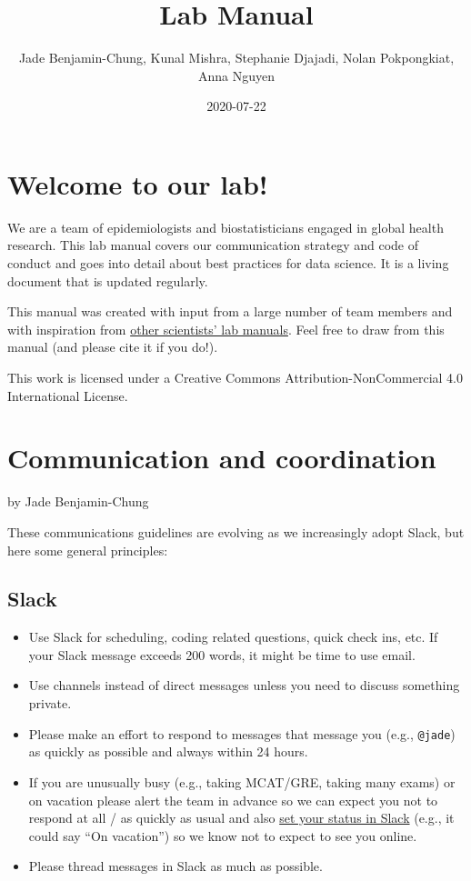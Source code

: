 \documentclass[]{book}
\title{Lab Manual}
\author{Jade Benjamin-Chung, Kunal Mishra, Stephanie Djajadi, Nolan Pokpongkiat,
Anna Nguyen}
\date{2020-07-22}
\providecommand{\tightlist}{%
  \setlength{\itemsep}{0pt}\setlength{\parskip}{0pt}}
\begin{document}
\maketitle

{
\setcounter{tocdepth}{1}
\tableofcontents
}
\chapter{Welcome to our lab!}\label{welcome-to-our-lab}

We are a team of epidemiologists and biostatisticians engaged in global
health research. This lab manual covers our communication strategy and
code of conduct and goes into detail about best practices for data
science. It is a living document that is updated regularly.

This manual was created with input from a large number of team members
and with inspiration from
\href{https://github.com/alylab/labmanual/blob/master/aly-lab-manual.pdf}{other
scientists' lab manuals}. Feel free to draw from this manual (and please
cite it if you do!).

 This work is licensed under a Creative Commons
Attribution-NonCommercial 4.0 International License.

\chapter{Communication and
coordination}\label{communication-and-coordination}

by Jade Benjamin-Chung

These communications guidelines are evolving as we increasingly adopt
Slack, but here some general principles:

\section{Slack}\label{slack}

\begin{itemize}
\tightlist
\item
  Use Slack for scheduling, coding related questions, quick check ins,
  etc. If your Slack message exceeds 200 words, it might be time to use
  email.
\item
  Use channels instead of direct messages unless you need to discuss
  something private.
\item
  Please make an effort to respond to messages that message you (e.g.,
  \texttt{@jade}) as quickly as possible and always within 24 hours.
\item
  If you are unusually busy (e.g., taking MCAT/GRE, taking many exams)
  or on vacation please alert the team in advance so we can expect you
  not to respond at all / as quickly as usual and also
  \href{https://get.slack.help/hc/en-us/articles/201864558-Set-your-Slack-status-and-availability}{set
  your status in Slack} (e.g., it could say ``On vacation'') so we know
  not to expect to see you online.
\item
  Please thread messages in Slack as much as possible.
\end{itemize}
\end{document}
